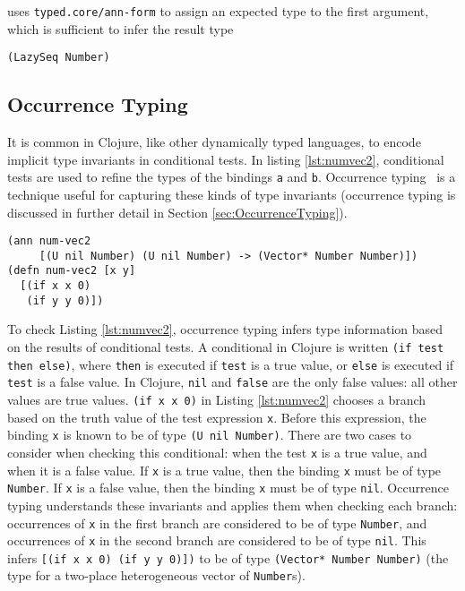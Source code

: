 uses \lstinline|typed.core/ann-form| to assign an expected type to
the first argument,
which is sufficient to infer the result type

\begin{lstlisting}
(LazySeq Number)
\end{lstlisting}


\subsection{Occurrence Typing}

It is common in Clojure, like other dynamically typed languages, to
encode implicit type invariants in conditional tests.
In listing \ref{lst:numvec2}, conditional tests are used
to refine the types of the bindings \lstinline|a| and \lstinline|b|.
Occurrence typing~\cite{TF10} is a technique useful for capturing these kinds
of type invariants (occurrence typing is discussed in further detail in Section \ref{sec:OccurrenceTyping}).

\begin{lstlisting}[caption=Example of occurrence typing in Typed Clojure, label=lst:numvec2]
(ann num-vec2 
     [(U nil Number) (U nil Number) -> (Vector* Number Number)])
(defn num-vec2 [x y]
  [(if x x 0) 
   (if y y 0)])
\end{lstlisting}

To check Listing \ref{lst:numvec2}, occurrence typing infers type information based on the results of conditional tests.
A conditional in Clojure is written \lstinline|(if test then else)|, where \lstinline|then|
is executed if \lstinline|test| is a true value, or \lstinline|else| is executed if \lstinline|test|
is a false value.
In Clojure, \lstinline|nil| and \lstinline|false| are the only false values: all other values are true values.
\lstinline|(if x x 0)| in Listing \ref{lst:numvec2} chooses a branch based on the truth value of the test expression \lstinline|x|.
Before this expression, the binding \lstinline|x| is known to be of type \lstinline|(U nil Number)|.
There are two cases to consider when checking this conditional: when the test \lstinline|x| is a true value, and when it is a false value.
If \lstinline|x| is a true value, then the binding \lstinline|x| must be of type \lstinline|Number|.
If \lstinline|x| is a false value, then the binding \lstinline|x| must be of type \lstinline|nil|.
Occurrence typing understands these invariants and applies them when checking each branch:
occurrences of \lstinline|x| in the first branch are considered to be of type \lstinline|Number|, and
occurrences of \lstinline|x| in the second branch are considered to be of type \lstinline|nil|.
This infers \lstinline|[(if x x 0) (if y y 0)])| to be of type
\lstinline|(Vector* Number Number)| (the type for a two-place heterogeneous vector of \lstinline|Number|s).

